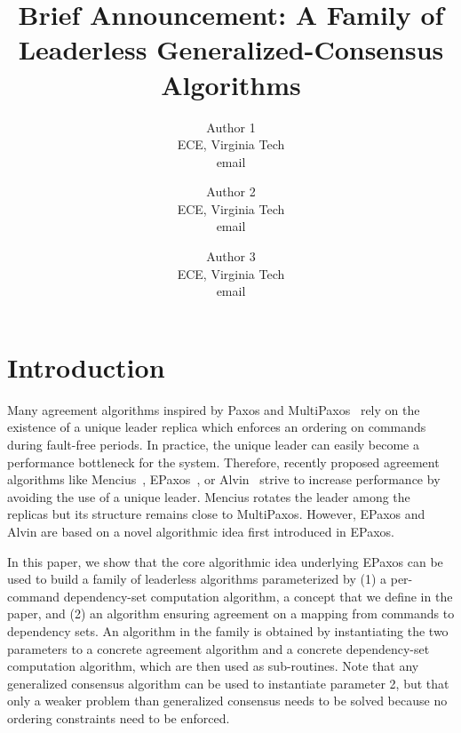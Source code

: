 

\title{\vspace{-0.8in}Brief Announcement: A Family of Leaderless Generalized-Consensus Algorithms}

\author{
Author 1\\
ECE, Virginia Tech\\
email
\and
Author 2\\
ECE, Virginia Tech\\
email
\and
Author 3\\
ECE, Virginia Tech\\
email
}

\date{}



\maketitle

%

\section{Introduction}

Many agreement algorithms inspired by Paxos and MultiPaxos~\cite{lamport2001paxos} rely on the existence of a unique leader replica which enforces an ordering on commands during fault-free periods.
In practice, the unique leader can easily become a performance bottleneck for the system.
Therefore, recently proposed agreement algorithms like Mencius~\cite{MaoJunqueiraMarzullo08MenciusBuildingEfficientReplicatedStateMachine}, EPaxos~\cite{MoraruAndersenKaminsky13ThereIsMoreConsensusEgalitarianParliaments}, or Alvin~\cite{TurcuETAL14BeGeneralDontGiveUpConsistency} strive to increase performance by avoiding the use of a unique leader.
Mencius rotates the leader among the replicas but its structure remains close to MultiPaxos. 
However, EPaxos and Alvin are based on a novel algorithmic idea first introduced in EPaxos.

In this paper, we show that the core algorithmic idea underlying EPaxos can be used to build a family of leaderless algorithms parameterized by (1) a per-command dependency-set computation algorithm, a concept that we define in the paper, and (2) an algorithm ensuring agreement on a mapping from commands to dependency sets. %
An algorithm in the family is obtained by instantiating the two parameters to a concrete agreement algorithm and a concrete dependency-set computation algorithm, which are then used as sub-routines. 
Note that any generalized consensus algorithm can be used to instantiate parameter 2, but that only a weaker problem than generalized consensus needs to be solved because no ordering constraints need to be enforced.

